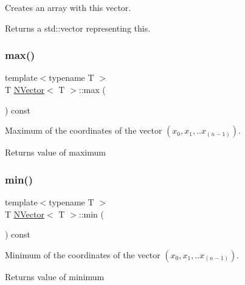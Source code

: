 Creates an array with {\ttfamily this} vector. 

\begin{DoxyReturn}{Returns}
a {\ttfamily std\+::vector} representing {\ttfamily this}. 
\end{DoxyReturn}
\mbox{\label{class_n_vector_afc7553743872ccb71e902a154eb60dc2}} 
\subsubsection{\texorpdfstring{max()}{max()}}
{\footnotesize\ttfamily template$<$typename T $>$ \\
T \mbox{\hyperlink{class_n_vector}{N\+Vector}}$<$ T $>$\+::max (\begin{DoxyParamCaption}{ }\end{DoxyParamCaption}) const}



Maximum of the coordinates of the vector $ (x_0, x_1, .. x_{(n-1)}) $. 

\begin{DoxyReturn}{Returns}
value of maximum 
\end{DoxyReturn}
\mbox{\label{class_n_vector_ab81d84a1fce6b8647e5fd4e34ec90db7}} 
\subsubsection{\texorpdfstring{min()}{min()}}
{\footnotesize\ttfamily template$<$typename T $>$ \\
T \mbox{\hyperlink{class_n_vector}{N\+Vector}}$<$ T $>$\+::min (\begin{DoxyParamCaption}{ }\end{DoxyParamCaption}) const}



Minimum of the coordinates of the vector $ (x_0, x_1, .. x_{(n-1)}) $. 

\begin{DoxyReturn}{Returns}
value of minimum 
\end{DoxyReturn}
\mbox{\label{class_n_vector_ab0521dd8dc4af0e9167770f85084d2d6}} 
